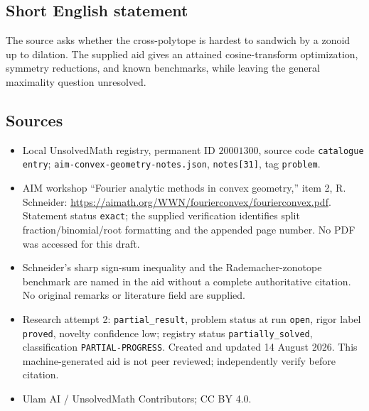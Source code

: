 \documentclass[11pt]{article}
\begin{document}
\subsection{Short English statement}
The source asks whether the cross-polytope is hardest to sandwich by a zonoid up to dilation. The supplied aid gives an attained cosine-transform optimization, symmetry reductions, and known benchmarks, while leaving the general maximality question unresolved.
\subsection{Sources}
\begin{itemize}
\item Local UnsolvedMath registry, permanent ID \(20001300\), source code \texttt{catalogue entry}; \texttt{aim-convex-geometry-notes.json}, \texttt{notes[31]}, tag \texttt{problem}.
\item AIM workshop ``Fourier analytic methods in convex geometry,'' item 2, R. Schneider: \url{https://aimath.org/WWN/fourierconvex/fourierconvex.pdf}. Statement status \texttt{exact}; the supplied verification identifies split fraction/binomial/root formatting and the appended page number. No PDF was accessed for this draft.
\item Schneider's sharp sign-sum inequality and the Rademacher-zonotope benchmark are named in the aid without a complete authoritative citation. No original remarks or literature field are supplied.
\item Research attempt 2: \texttt{partial\_result}, problem status at run \texttt{open}, rigor label \texttt{proved}, novelty confidence low; registry status \texttt{partially\_solved}, classification \texttt{PARTIAL-PROGRESS}. Created and updated 14 August 2026. This machine-generated aid is not peer reviewed; independently verify before citation.
\item Ulam AI / UnsolvedMath Contributors; CC BY 4.0.
\end{itemize}
\end{document}
